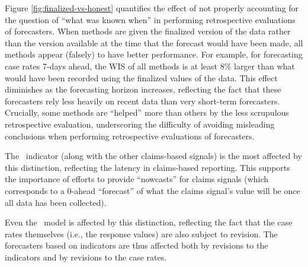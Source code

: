 \documentclass[9pt,twocolumn,twoside,lineno]{pnas-new}
\begin{document}
Figure \ref{fig:finalized-vs-honest} quantifies the effect of
not properly accounting for the question of ``what was known when'' in
performing retrospective evaluations of forecasters.  When methods are
given the finalized version of the data rather than the version available at the time that the forecast would have been made, all methods
appear (falsely) to have better performance.  For example, for forecasting case rates
7-days ahead, the WIS of all methods is at least 8\% larger than what would have been
recorded using the finalized values of the data.  This effect
diminishes as the forecasting horizon increases, reflecting the fact
that these forecasters rely less heavily on recent data than very
short-term forecasters.  Crucially, some methods are
``helped'' more than others by the less scrupulous retrospective
evaluation, underscoring the difficulty of avoiding misleading
conclusions when performing retrospective evaluations of forecasters.

The \chngcli~indicator (along with the other claims-based signals) is the most
affected by this distinction, reflecting the latency in claims-based
reporting.   This supports
the importance of efforts to provide ``nowcasts'' for claims signals
(which corresponds to a 0-ahead ``forecast'' of what the claims
signal's value will be once all data has been collected).

Even the \ar~model is affected by this distinction, reflecting the
fact that the case rates themselves (i.e., the response values) are also
subject to revision.  The forecasters based on indicators are thus
affected both by revisions to the indicators and by revisions to the
case rates.
\end{document}
